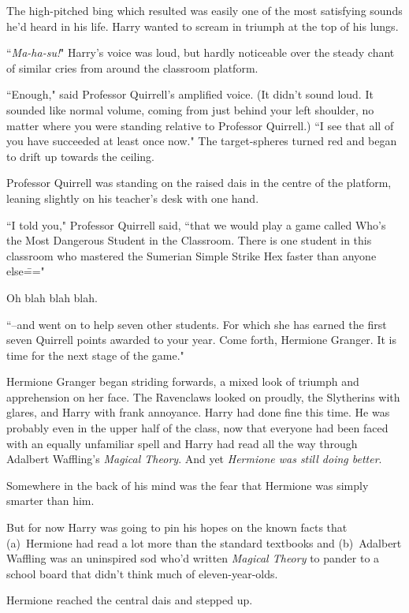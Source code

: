 The high-pitched bing which resulted was easily one of the most satisfying sounds he'd heard in his life. Harry wanted to scream in triumph at the top of his lungs. \emph{}

``\emph{Ma-ha-su!}" Harry's voice was loud, but hardly noticeable over the steady chant of similar cries from around the classroom platform.

``Enough," said Professor Quirrell's amplified voice. (It didn't sound loud. It sounded like normal volume, coming from just behind your left shoulder, no matter where you were standing relative to Professor Quirrell.) ``I see that all of you have succeeded at least once now." The target-spheres turned red and began to drift up towards the ceiling.

Professor Quirrell was standing on the raised dais in the centre of the platform, leaning slightly on his teacher's desk with one hand.

``I told you," Professor Quirrell said, ``that we would play a game called Who's the Most Dangerous Student in the Classroom. There is one student in this classroom who mastered the Sumerian Simple Strike Hex faster than anyone else\==="

Oh blah blah blah.

``\---and went on to help seven other students. For which she has earned the first seven Quirrell points awarded to your year. Come forth, Hermione Granger. It is time for the next stage of the game."

Hermione Granger began striding forwards, a mixed look of triumph and apprehension on her face. The Ravenclaws looked on proudly, the Slytherins with glares, and Harry with frank annoyance. Harry had done fine this time. He was probably even in the upper half of the class, now that everyone had been faced with an equally unfamiliar spell and Harry had read all the way through Adalbert Waffling's \emph{Magical Theory}. And yet \emph{Hermione was still doing better}.

Somewhere in the back of his mind was the fear that Hermione was simply smarter than him.

But for now Harry was going to pin his hopes on the known facts that (a)~Hermione had read a lot more than the standard textbooks and (b)~Adalbert Waffling was an uninspired sod who'd written \emph{Magical Theory} to pander to a school board that didn't think much of eleven-year-olds.

Hermione reached the central dais and stepped up.

